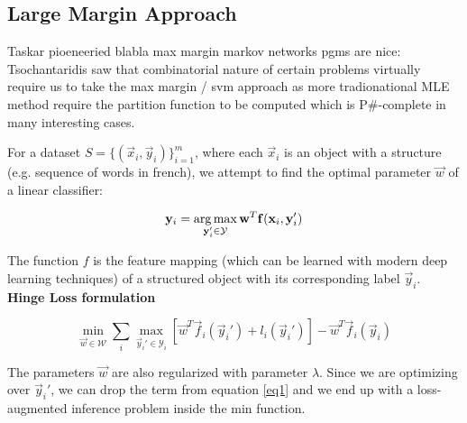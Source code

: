 \subsection{Large Margin Approach}
Taskar pioeneeried blabla max margin markov networks pgms are nice: \cite{taskarMaxMarginMarkovNetworks2004}
Tsochantaridis saw that combinatorial nature of certain problems virtually
require us to take the max margin / svm approach as more tradionational MLE
method require the partition function to be computed which is P\#-complete in
many interesting cases.\cite{tsochantaridisSupportVectorMachine}

For a dataset $ S = \{ (\vec x_i, \vec y_i) \}_{i=1}^{m} $,
where each $\vec x_i$ is an object with a structure (e.g. sequence of words in
french), we attempt to find the optimal parameter $\vec w$ of a linear classifier:

\begin{equation}
  \mathbf y_i = \operatorname*{\arg\max}_{\mathbf y_i' \in \mathcal{Y}} \mathbf w^T \mathbf f(\mathbf x_i,\mathbf y_i')
  \label{eq1}
\end{equation}

The function $f$ is the feature mapping (which can be learned with modern deep
learning techniques) of a structured object with its
corresponding label $\vec y_i$. \textbf{Hinge Loss formulation}

\begin{equation}
  \min_{\vec w \in \mathcal{W}} \sum_i \max_{\vec y_i' \in \mathcal{Y}_i} \left[
\vec w^T \vec f_i(\vec y_i') + l_i(\vec y_i') \right] - \vec w^T \vec f_i(\vec
y_i)
\end{equation}

The parameters $\vec w$ are also regularized with parameter $\lambda$. Since we are
optimizing over $\vec y_i'$, we can drop the term from equation \ref{eq1} and we end
up with a loss-augmented inference problem inside the min function.




